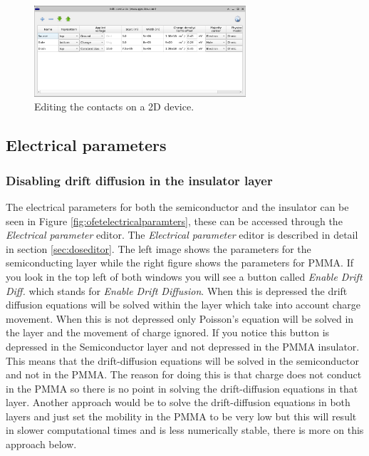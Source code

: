 \begin{figure}[H]
\centering
\includegraphics[width=0.7\textwidth]{./images/ofet/ofet_3.png}
\caption{Editing the contacts on a 2D device.}
\label{fig:ofetcontacteditor}
\end{figure}

\subsection{Electrical parameters}
\subsubsection{Disabling drift diffusion in the insulator layer}
The electrical parameters for both the semiconductor and the insulator can be seen in Figure \ref{fig:ofetelectricalparamters}, these can be accessed through the \emph{Electrical parameter} editor. The \emph{Electrical parameter} editor is described in detail in section \ref{sec:doseditor}. The left image shows the parameters for the semiconducting layer while the right figure shows the parameters for PMMA. If you look in the top left of both windows you will see a button called \emph{Enable Drift Diff.} which stands for \emph{Enable Drift Diffusion}. When this is depressed the drift diffusion equations will be solved within the layer which take into account charge movement. When this is not depressed only Poisson's equation will be solved in the layer and the movement of charge ignored. If you notice this button is depressed in the Semiconductor layer and not depressed in the PMMA insulator.  This means that the drift-diffusion equations will be solved in the semiconductor and not in the PMMA. The reason for doing this is that charge does not conduct in the PMMA so there is no point in solving the drift-diffusion equations in that layer. Another approach would be to solve the drift-diffusion equations in both layers and just set the mobility in the PMMA to be very low but this will result in slower computational times and is less numerically stable, there is more on this approach below.

